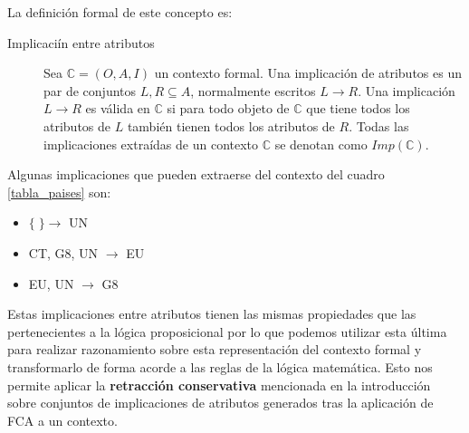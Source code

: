 	La definición formal de este concepto es: 
	
	\begin{description}
		\item[Implicaciín entre atributos] Sea $\mathbb{C} = (O,A,I)$ un contexto formal. Una implicación de atributos es un par de conjuntos $L, R \subseteq A$, normalmente escritos $L \rightarrow R$. Una implicación $L \rightarrow R$ es válida en $\mathbb{C}$ si para todo objeto de $\mathbb{C}$ que tiene todos los atributos de $L$ también tienen todos los atributos de $R$. Todas las implicaciones extraídas de un contexto $\mathbb{C}$ se denotan como $Imp(\mathbb{C})$.
	\end{description}
	
	Algunas implicaciones que pueden extraerse del contexto del cuadro \ref{tabla_paises} son:
	
	\begin{itemize}
		\item $\{\;\} \rightarrow$ UN
		\item CT, G8, UN $\rightarrow$ EU
		\item EU, UN $\rightarrow$ G8 
	\end{itemize}

	Estas implicaciones entre atributos tienen las mismas propiedades que las pertenecientes a la lógica proposicional por lo que podemos utilizar esta última para realizar razonamiento sobre esta representación del contexto formal y transformarlo de forma acorde a las reglas de la lógica matemática. Esto nos permite aplicar la \textbf{retracción conservativa} mencionada en la introducción sobre conjuntos de implicaciones de atributos generados tras la aplicación de FCA a un contexto.

